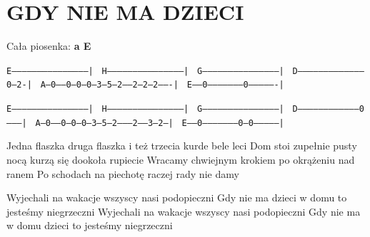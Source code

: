 \documentclass[../../../songbook.tex]{subfiles}
\begin{document}
\TabPositions{8cm} %
\section*{GDY NIE MA DZIECI}
{}
\vspace{0.5cm}
Cała piosenka: {\color{red}\textbf{a E } } \newline

 \texttt{E--------------------------------------------| } 	\newline 	
 \texttt{H--------------------------------------------|	}	\newline 	
 \texttt{G--------------------------------------------|	}	\newline 	
 \texttt{D---------------------------------------0--2-|	}	\newline 	
 \texttt{A--0------0--0--0--3--5--2-----2--2--2-------|	}	\newline 	
 \texttt{E-----0---------------------0----------------|	}	\newline 
 
\texttt{E--------------------------------------------|	}	\newline 	
\texttt{H--------------------------------------------|	}	\newline 	
\texttt{G--------------------------------------------|	}	\newline 	
\texttt{D-----------------------------------0--------|	}	\newline 	
\texttt{A--0-----0--0--0--3--5--2--------2-----3--2--|	}	\newline 	
\texttt{E-----0--------------------0--0--------------|	}	\newline 	

Jedna flaszka druga flaszka i też trzecia kurde bele leci  \newline  	
Dom stoi zupełnie pusty nocą kurzą się dookoła rupiecie		\newline
Wracamy chwiejnym krokiem po okrążeniu nad ranem			\newline
Po schodach na piechotę raczej rady nie damy				\newline

\-\hspace{1cm} Wyjechali na wakacje wszyscy nasi podopieczni		\newline
\-\hspace{1cm} Gdy nie ma dzieci w domu to jesteśmy niegrzeczni		\newline
\-\hspace{1cm} Wyjechali na wakacje wszyscy nasi podopieczni		\newline
\-\hspace{1cm} Gdy nie ma w domu dzieci to jesteśmy niegrzeczni		\newline
\end{document}
